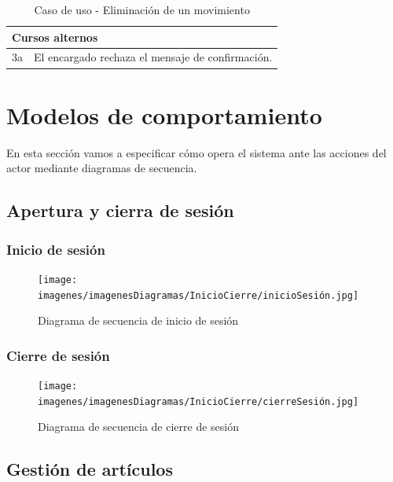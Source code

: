 \begin{table}[H]
	\centering
	\begin{tabular}{| m{} | m{} | m{} | m{} |}
		\hline
		\multicolumn{4}{|m{0.9\textwidth}|}{Cursos alternos}     \\ 
		\hline
		3a & \multicolumn{3}{m{0.67\textwidth}|}{El encargado rechaza el mensaje de confirmación.} \\ 
		\hline
	\end{tabular}
	\caption{Caso de uso - Eliminación de un movimiento}
\end{table}

\newpage


\section{Modelos de comportamiento}

En esta sección vamos a especificar cómo opera el sistema ante las acciones del actor mediante diagramas de secuencia. 

\subsection{Apertura y cierra de sesión}

\subsubsection{Inicio de sesión}

\begin{figure}[H]
	\centering
	\texttt{[image: imagenes/imagenesDiagramas/InicioCierre/inicioSesión.jpg]}
	\caption{Diagrama de secuencia de inicio de sesión}
	\label{fig:seqdiag1}
\end{figure}

\subsubsection{Cierre de sesión}

\begin{figure}[H]
	\centering
	\texttt{[image: imagenes/imagenesDiagramas/InicioCierre/cierreSesión.jpg]}
	\caption{Diagrama de secuencia de cierre de sesión}
	\label{fig:seqdiag2}
\end{figure}

\subsection{Gestión de artículos}

